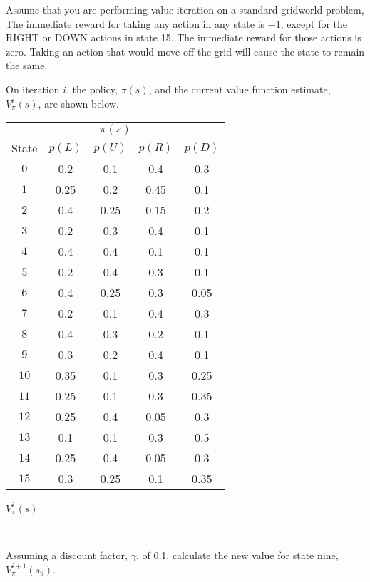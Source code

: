\documentclass[12pt]{exam}
\begin{document}
\begin{question}{30}
  Assume that you are performing value iteration on a standard gridworld problem,   The immediate reward for taking any action in any state is $-1$, except for the RIGHT or DOWN actions in state 15.  The immediate reward for those actions is zero.  Taking an action that would move off the grid will cause the state to remain the same.

  On iteration $i$, 
  the policy, $\pi(s)$, and the current value function estimate, $V^i_\pi(s)$, are shown below.
  \begin{center}
    \begin{tabular}[c]{c|c|c|c|c|}
      \multicolumn{5}{c}{$\pi(s)$}\\
    State & $p(L)$ & $p(U)$ & $p(R)$ & $p(D)$ \\
    \hline
    \hline
  $0$ & 0.2 & 0.1 & 0.4 & 0.3 \\
  $1$ & 0.25 & 0.2 & 0.45 & 0.1 \\
  $2$ & 0.4 & 0.25 & 0.15 & 0.2 \\
  $3$ & 0.2 & 0.3 & 0.4 & 0.1 \\
  $4$ & 0.4 & 0.4 & 0.1 & 0.1 \\
  $5$ & 0.2 & 0.4 & 0.3 & 0.1 \\
  $6$ & 0.4 & 0.25 & 0.3 & 0.05 \\
  $7$ & 0.2 & 0.1 & 0.4 & 0.3 \\
  $8$ & 0.4 & 0.3 & 0.2 & 0.1\\
  $9$ & 0.3 & 0.2 & 0.4 & 0.1 \\
  $10$ & 0.35 & 0.1 & 0.3 & 0.25 \\
  $11$ & 0.25 & 0.1 & 0.3 & 0.35\\
  $12$ & 0.25 & 0.4 & 0.05 & 0.3 \\
  $13$ & 0.1 & 0.1 & 0.3 & 0.5\\
  $14$ & 0.25 & 0.4 & 0.05 & 0.3 \\
  $15$ & 0.3 & 0.25 & 0.1 & 0.35\\
  \end{tabular} \hspace{0.5in}
  \newlength{\gww}
  \settowidth{\gww}{\scalebox{0.5}{}}
  \parbox[c]{\gww}{
    \centerline{$V^i_\pi(s)$}
    \ \\
    \scalebox{0.5}{}}
  \end{center}
  \begin{subquestion}
  Assuming a discount factor, $\gamma$, of 0.1, calculate the new value for state nine, $V^{i+1}_\pi(s_9)$.
  

\end{subquestion}
\end{question}
\end{document}
